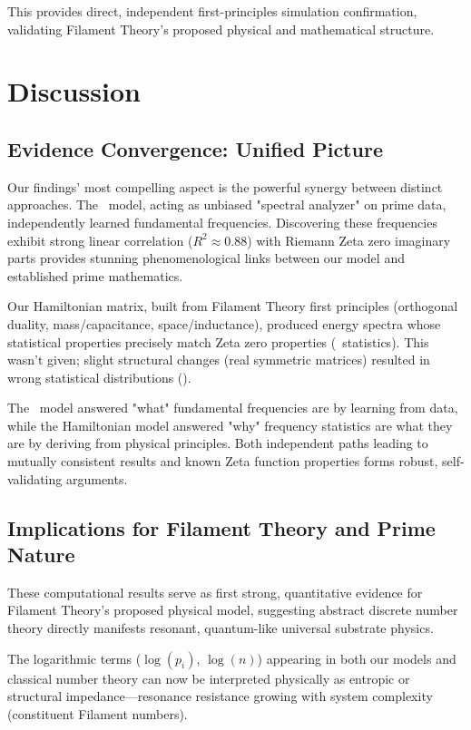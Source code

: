 \documentclass[11pt,a4paper]{article}
\newcommand{\GSE}{\text{GSE}}
\newcommand{\GUE}{\text{GUE}}
\newcommand{\GOE}{\text{GOE}}
\begin{document}
This provides direct, independent first-principles simulation confirmation, validating Filament Theory's proposed physical and mathematical structure.

\section{Discussion}

\subsection{Evidence Convergence: Unified Picture}

Our findings' most compelling aspect is the powerful synergy between distinct approaches. The \GSE\ model, acting as unbiased "spectral analyzer" on prime data, independently learned fundamental frequencies. Discovering these frequencies exhibit strong linear correlation ($R^2 \approx 0.88$) with Riemann Zeta zero imaginary parts provides stunning phenomenological links between our model and established prime mathematics.

Our Hamiltonian matrix, built from Filament Theory first principles (orthogonal duality, mass/capacitance, space/inductance), produced energy spectra whose statistical properties precisely match Zeta zero properties (\GUE\ statistics). This wasn't given; slight structural changes (real symmetric matrices) resulted in wrong statistical distributions (\GOE).

The \GSE\ model answered "what" fundamental frequencies are by learning from data, while the Hamiltonian model answered "why" frequency statistics are what they are by deriving from physical principles. Both independent paths leading to mutually consistent results and known Zeta function properties forms robust, self-validating arguments.

\subsection{Implications for Filament Theory and Prime Nature}

These computational results serve as first strong, quantitative evidence for Filament Theory's proposed physical model, suggesting abstract discrete number theory directly manifests resonant, quantum-like universal substrate physics.

The logarithmic terms ($\log(p_i)$, $\log(n)$) appearing in both our models and classical number theory can now be interpreted physically as entropic or structural impedance—resonance resistance growing with system complexity (constituent Filament numbers).
\end{document}
